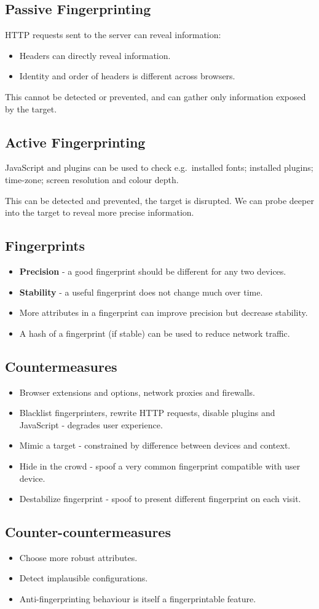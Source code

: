 \documentclass[11pt]{article}
\begin{document}
\subsection{Passive Fingerprinting}
HTTP requests sent to the server can reveal information:
\begin{itemize}
  \item Headers can directly reveal information.
  \item Identity and order of headers is different across browsers.
\end{itemize}

This cannot be detected or prevented, and can gather only information exposed by the target.

\subsection{Active Fingerprinting}
JavaScript and plugins can be used to check e.g.\ installed fonts; installed plugins; time-zone; screen resolution and colour depth.

This can be detected and prevented, the target is disrupted.
We can probe deeper into the target to reveal more precise information.

\subsection{Fingerprints}
\begin{itemize}
  \item \textbf{Precision} - a good fingerprint should be different for any two devices.
  \item \textbf{Stability} - a useful fingerprint does not change much over time.
  \item More attributes in a fingerprint can improve precision but decrease stability.
  \item A hash of a fingerprint (if stable) can be used to reduce network traffic.
\end{itemize}

\subsection{Countermeasures}
\begin{itemize}
  \item Browser extensions and options, network proxies and firewalls.
  \item Blacklist fingerprinters, rewrite HTTP requests, disable plugins and JavaScript - degrades user experience.
  \item Mimic a target - constrained by difference between devices and context.
  \item Hide in the crowd - spoof a very common fingerprint compatible with user device.
  \item Destabilize fingerprint - spoof to present different fingerprint on each visit.
\end{itemize}

\subsection{Counter-countermeasures}
\begin{itemize}
  \item Choose more robust attributes.
  \item Detect implausible configurations.
  \item Anti-fingerprinting behaviour is itself a fingerprintable feature.
\end{itemize}
\end{document}
